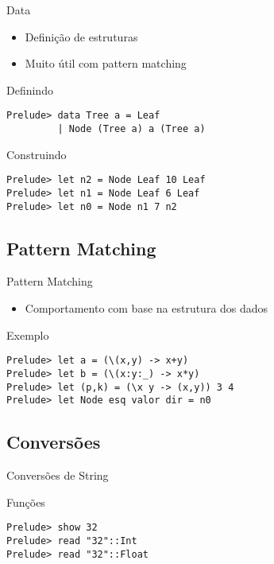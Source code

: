 \documentclass{beamer}
\begin{document}
		\begin{frame}[fragile]{Data}
		 
		 \begin{itemize}
		  \item Definição de estruturas
		  \item Muito útil com pattern matching
		 \end{itemize}
		 
		 \begin{block}{Definindo}
		  \begin{lstlisting}
Prelude> data Tree a = Leaf 
         | Node (Tree a) a (Tree a)
		  \end{lstlisting}
		 \end{block}		 
		 \begin{block}{Construindo}
		  \begin{lstlisting}
Prelude> let n2 = Node Leaf 10 Leaf
Prelude> let n1 = Node Leaf 6 Leaf
Prelude> let n0 = Node n1 7 n2
		  \end{lstlisting}
		 \end{block}
		\end{frame}
		
		\subsection{Pattern Matching}
		
		\begin{frame}[fragile]{Pattern Matching}
		\begin{itemize}
		 \item Comportamento com base na estrutura dos dados
		\end{itemize}	
		
		 \begin{block}{Exemplo}
		  \begin{lstlisting}
Prelude> let a = (\(x,y) -> x+y)
Prelude> let b = (\(x:y:_) -> x*y)
Prelude> let (p,k) = (\x y -> (x,y)) 3 4
Prelude> let Node esq valor dir = n0
		  \end{lstlisting}
		 \end{block}
		\end{frame}
		
		\subsection{Conversões}

			\begin{frame}[fragile]{Conversões de String}
			 \begin{block}{Funções}
			  \begin{lstlisting}
Prelude> show 32
Prelude> read "32"::Int
Prelude> read "32"::Float
			  \end{lstlisting}
			 \end{block}
			\end{frame}
			
\end{document}
